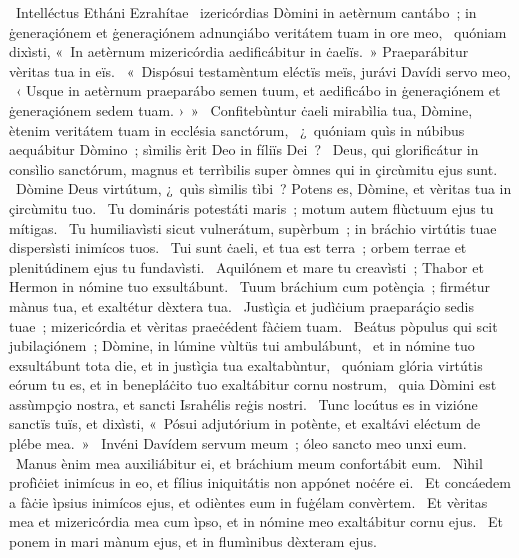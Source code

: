 {~Intelléctus Etháni Ezrahítae}
{%
~izericórdias Dòmini in aetèrnum cantábo~; in ġeneraçiónem et ġeneraçiónem adnunçiábo veritátem tuam in ore meo,
~quóniam dixìsti, «~In aetèrnum mizericórdia aedificábitur in ċaelïs.~» Praeparábitur vèritas tua in eïs.
~«~Dispósui testamèntum eléctïs meïs, jurávi Davídi servo meo,
~‹ Usque in aetèrnum praeparábo semen tuum, et aedificábo in ġeneraçiónem et ġeneraçiónem sedem tuam. ›~»
~Confitebùntur ċaeli mirabìlia tua, Dòmine, ètenim veritátem tuam in ecclésia sanctórum,
~¿~quóniam quìs in núbibus aequábitur Dòmino~; sìmilis èrit Deo in fíliïs Dei~?
~Deus, qui glorificátur in consìlio sanctórum, magnus et terrìbilis super òmnes qui in çircùmitu ejus sunt.
~Dòmine Deus virtútum, ¿~quìs sìmilis tìbi~? Potens es, Dòmine, et vèritas tua in çircùmitu tuo.
~Tu domináris potestáti maris~; motum autem flùctuum ejus tu mítigas.
~Tu humiliavìsti sicut vulnerátum, supèrbum~; in bráchio virtútis tuae dispersìsti inimícos tuos.
~Tui sunt ċaeli, et tua est terra~; orbem terrae et plenitúdinem ejus tu fundavìsti.
~Aquilónem et mare tu creavìsti~; Thabor et Hermon in nómine tuo exsultábunt.
~Tuum bráchium cum potènçia~; firmétur mànus tua, et exaltétur dèxtera tua.
~Justìçia et judìċium praeparáçio sedis tuae~; mizericórdia et vèritas praeċédent fàċiem tuam.
~Beátus pòpulus qui scit jubilaçiónem~; Dòmine, in lúmine vùltüs tui ambulábunt,
~et in nómine tuo exsultábunt tota die, et in justìçia tua exaltabùntur,
~quóniam glória virtútis eórum tu es, et in benepláċito tuo exaltábitur cornu nostrum,
~quia Dòmini est assùmpçio nostra, et sancti Israhélis reġis nostri.
~Tunc locútus es in vizióne sanctïs tuïs, et dixìsti, «~Pósui adjutórium in potènte, et exaltávi eléctum de plébe mea.~»
~Invéni Davídem servum meum~; óleo sancto meo unxi eum.
~Manus ènim mea auxiliábitur ei, et bráchium meum confortábit eum.
~Nìhil profìċiet inimícus in eo, et fílius iniquitátis non appónet noċére ei.
~Et concáedem a fàċie ìpsius inimícos ejus, et odièntes eum in fuġélam convèrtem.
~Et vèritas mea et mizericórdia mea cum ìpso, et in nómine meo exaltábitur cornu ejus.
~Et ponem in mari mànum ejus, et in flumìnibus dèxteram ejus.
}
